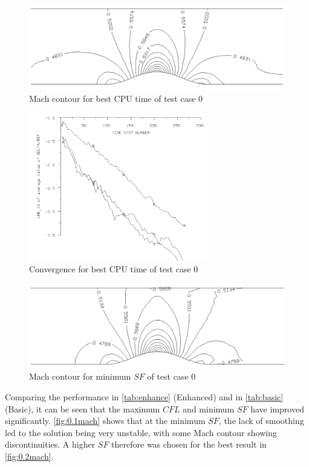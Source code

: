 \documentclass[12pt, a4paper]{article}
\begin{document}
\begin{figure}[H]
	\centering
	\includegraphics[width=\textwidth]{plots/0.2 mach}
	\caption{Mach contour for best CPU time of test case 0}
	\label{fig:0.2mach}
\end{figure}
\begin{figure}[h]
	\centering
	\includegraphics[width=0.7\textwidth]{plots/0.2 conv}
	\caption{Convergence for best CPU time of test case 0}
	\label{fig:0.2conv}
\end{figure}
\begin{figure}[h]
	\centering
	\includegraphics[width=\textwidth]{plots/0.1 mach}
	\caption{Mach contour for minimum $SF$ of test case 0}
	\label{fig:0.1mach}
\end{figure}

Comparing the performance in \autoref{tab:enhance} (Enhanced) and in \autoref{tab:basic} (Basic), it can be seen that the maximum $CFL$ and minimum $SF$ have improved significantly. \autoref{fig:0.1mach} shows that at the minimum $SF$, the lack of smoothing led to the solution being very unstable, with some Mach contour showing discontinuities. A higher $SF$ therefore was chosen for the best result in \autoref{fig:0.2mach}. 
\end{document}
